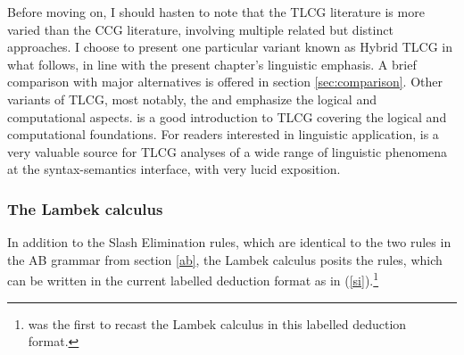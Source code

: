 \documentclass[output=paper]{langsci/langscibook}
\begin{document}
Before moving on, I should hasten to note that the TLCG literature is
more varied than the CCG literature, involving multiple related but
distinct approaches. I choose to present one particular variant known
as Hybrid TLCG in what follows, in line with the present chapter's linguistic
emphasis. A brief comparison with major alternatives is offered in
section \ref{sec:comparison}. Other variants of TLCG, most notably,
the  \citep{Moortgat2011a-u} and
 \citep{morrill2011} emphasize the logical and computational
aspects. \citet{mootretore2012} is a good introduction to TLCG covering
the logical and computational foundations. For readers interested in
linguistic application, \citet{Carpenter98a-u} is a very valuable source for
TLCG analyses of a wide range of linguistic phenomena at the
syntax-semantics interface, with very lucid exposition.


\subsubsection{The Lambek calculus \label{lambek}}

In addition to the Slash Elimination rules, which are identical to the
two rules in the AB grammar from section \ref{ab}, the Lambek calculus
posits the  rules, which can be written in the
current labelled deduction format as in (\ref{si}).\footnote{\citet{Morrill94a-u}
was the first to recast the Lambek calculus in this labelled deduction format.}
\end{document}
